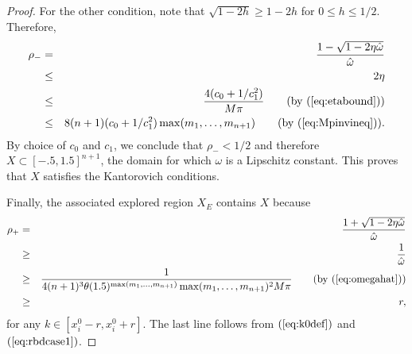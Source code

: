 \documentclass{article}
\newcommand\eref[1]{$(\ref{#1})$}
\begin{document}
\begin{proof}
For the other condition, note that $\sqrt{1-2h} \geq 1-2h$ for $0
\leq h \leq 1/2$. Therefore,
\begin{eqnarray}
\rho_- & = & \frac{1-\sqrt{1-2\eta\hat\omega}}{\hat \omega}
\nonumber \\
& \leq & 2\eta \nonumber \\
&\le & \frac{4(c_0+1/c_1^2)}{M\pi}\qquad\mbox{(by \eref{eq:etabound})} \nonumber\\
&\le & 8(n+1)(c_0+1/c_1^2)\max(m_1,\ldots, m_{n+1})\qquad\mbox{(by \eref{eq:Mpinvineq})}.
\label{rho_to_gamma}
\end{eqnarray}
By choice of $c_0$ and $c_1$, we conclude that $\rho_-<1/2$ and
therefore $X\subset [-.5,1.5]^{n+1}$, the domain for which $\omega$ is
a Lipschitz constant.
This proves that $X$ satisfies the Kantorovich conditions.

Finally, the associated explored region $X_E$ contains $X$ because
\begin{eqnarray*}
\rho_+ & = & \frac{1+\sqrt{1-2\eta\hat\omega}}{\hat \omega}
\nonumber \\
& \geq & \frac{1}{\hat \omega} \nonumber \\
& \geq & \frac{1}
{4(n+1)^3\theta(1.5)^{\max(m_1,\ldots,m_{n+1})}\max(m_1,\ldots,m_{n+1})^2M\pi}
\qquad\mbox{(by \eref{eq:omegahat})} \\
&\ge & r, \nonumber
\end{eqnarray*}
for any $k \in [x^0_i-r,x^0_i+r]$.
The last line follows from \eref{eq:k0def} and \eref{eq:rbdcase1}.


\end{proof}
\end{document}
